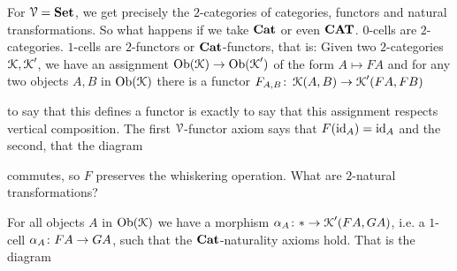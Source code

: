 \documentclass[a4paper,11pt,oneside,openany]{scrbook}
\begin{document}
\begin{exmp}
	For $\operatorname{\mathcal{V}}={\normalfont\textbf{Set}}$, we get precisely the $2$-categories of categories, functors and natural transformations. So what happens if we take ${\normalfont\textbf{Cat}}$ or even ${\normalfont\textbf{CAT}}$.
	$0$-cells are $2$-categories. $1$-cells are $2$-functors or ${\normalfont\textbf{Cat}}$-functors, that is: Given two $2$-categories $\operatorname{\mathcal{K}},\operatorname{\mathcal{K}}'$, we have an assignment
	$\operatorname{Ob}(\operatorname{\mathcal{K}}) \to \operatorname{Ob}(\operatorname{\mathcal{K}}')$ of the form $A \mapsto FA$ and for any two objects $A,B$ in $\operatorname{Ob}(\operatorname{\mathcal{K}})$ there is a functor $F_{A,B} \colon \operatorname{\mathcal{K}}(A,B) \to \operatorname{\mathcal{K}}'(FA,FB)$
	\begin{center}
	\end{center}
	to say that this defines a functor is exactly to say that this assignment respects vertical composition. The first $\operatorname{\mathcal{V}}$-functor axiom says that $F(\operatorname{id}_{A}) =\operatorname{id}_{A}$
	and the second, that the diagram
	\begin{center}
	\end{center}
	commutes, so $F$ preserves the whiskering operation. What are $2$-natural transformations?
	\begin{center}
	\end{center}
	For all objects $A$ in $\operatorname{Ob}(\operatorname{\mathcal{K}})$ we have a morphism $\alpha_{A} \colon \ast \to \operatorname{\mathcal{K}}'(FA,GA)$, i.e. a $1$-cell $\alpha_{A} \colon FA \to GA$, such that
	the ${\normalfont\textbf{Cat}}$-naturality axioms hold. That is the diagram
	\begin{center}
\end{center}
\end{exmp}
\end{document}
